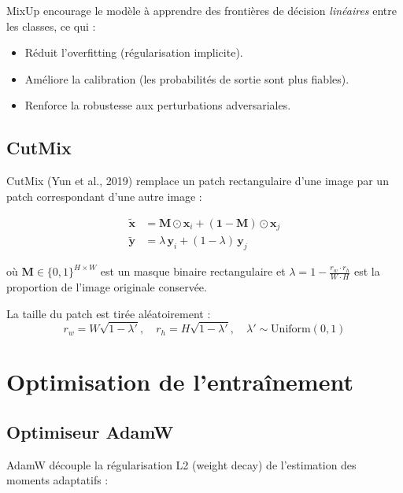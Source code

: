\documentclass[11pt,a4paper]{article}
\begin{document}
\begin{notebox}
MixUp encourage le modèle à apprendre des frontières de décision \emph{linéaires} entre les classes, ce qui :
\begin{itemize}
  \item Réduit l'overfitting (régularisation implicite).
  \item Améliore la calibration (les probabilités de sortie sont plus fiables).
  \item Renforce la robustesse aux perturbations adversariales.
\end{itemize}
\end{notebox}

\subsection{CutMix}

CutMix (Yun et al., 2019) remplace un patch rectangulaire d'une image par un patch correspondant d'une autre image :

\begin{align}
  \tilde{\mathbf{x}} &= \mathbf{M} \odot \mathbf{x}_i + (\mathbf{1} - \mathbf{M}) \odot \mathbf{x}_j \\
  \tilde{\mathbf{y}} &= \lambda\,\mathbf{y}_i + (1 - \lambda)\,\mathbf{y}_j
\end{align}

où $\mathbf{M} \in \{0,1\}^{H \times W}$ est un masque binaire rectangulaire et $\lambda = 1 - \frac{r_w \cdot r_h}{W \cdot H}$ est la proportion de l'image originale conservée.

La taille du patch est tirée aléatoirement :
\begin{equation}
  r_w = W\sqrt{1-\lambda'}, \quad r_h = H\sqrt{1-\lambda'}, \quad \lambda' \sim \text{Uniform}(0,1)
\end{equation}

\section{Optimisation de l'entraînement}

\subsection{Optimiseur AdamW}

AdamW découple la régularisation L2 (weight decay) de l'estimation des moments adaptatifs :
\end{document}
